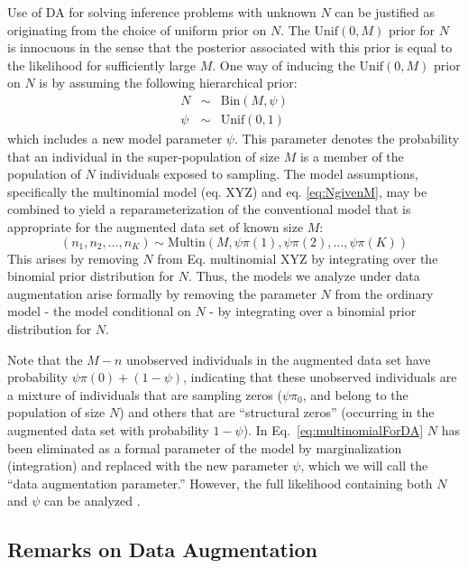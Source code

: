 Use of DA for solving inference problems with unknown $N$ can be
justified as originating from the choice of uniform prior on $N$.  The
$\mathrm{Unif}(0,M)$ prior for $N$ is innocuous in the sense that the
posterior associated with this prior is equal to the likelihood for
sufficiently large $M$.  One way of inducing the $\mathrm{Unif}(0,M)$
prior on $N$ is by assuming the following hierarchical prior:
\begin{eqnarray}\label{eq:NgivenM}
  N &\sim& \mathrm{Bin}(M, \psi) \\ \nonumber
  \psi &\sim& \mathrm{Unif}(0,1)
\end{eqnarray}
which includes a new model parameter $\psi$.  This parameter denotes
the probability that an individual in the super-population of size $M$
is a member of the population of $N$ individuals exposed to sampling.
The model assumptions, specifically the multinomial model (eq. XYZ)
and eq. \ref{eq:NgivenM}, may be combined to yield a
reparameterization of the conventional model that is appropriate for
the augmented data set of known size $M$:
\begin{equation}\label{eq:multinomialForDA}
    (n_1, n_2, \ldots, n_K) \sim \mathrm{Multin}(M, \psi  \pi(1), \psi \pi(2), \ldots, \psi \pi(K))
\end{equation}
This arises by removing $N$ from Eq. multinomial XYZ by integrating
over the binomial prior distribution for $N$. Thus, the models we
analyze under data augmentation arise formally by removing the
parameter $N$ from the ordinary model - the model conditional on $N$ -
by integrating over a binomial prior distribution for $N$.

Note that the $M-n$ unobserved individuals in the augmented data set
have probability $\psi \pi(0) + (1-\psi)$, indicating that these
unobserved individuals are a mixture of individuals that are sampling
zeros ($\psi \pi_0$, and belong to the population of size $N$) and
others that are ``structural zeros'' (occurring in the augmented data
set with probability $1 - \psi$). In Eq.~\ref{eq:multinomialForDA} $N$
has been eliminated as a formal parameter of the model by
marginalization (integration) and replaced with the new parameter
$\psi$, which we will call the ``data augmentation parameter.''
However, the full likelihood containing both $N$ and $\psi$ can be
analyzed \citep[see][]{royle_etal:2007}.


\subsection{Remarks on Data Augmentation}

